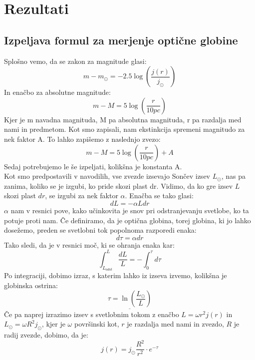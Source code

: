 \documentclass[12pt, a4paper]{article}
\begin{document}
\pagebreak
\section{Rezultati}
\subsection{Izpeljava formul za merjenje optične globine}
Splošno vemo, da se zakon za  magnitude glasi:
\begin{equation} \label{eq:Eq2}
	   m-m_{\odot}=-2.5\log\left(\frac{j(r)}{j_{\odot}}\right)
		\end{equation}
In enačbo za absolutne magnitude:
\begin{equation} \label{eq:Eq3}
	   m-M=5\log\left(\frac{r}{10pc}\right)
		\end{equation}
Kjer je m navadna magnituda, M pa absolutna magnituda, r pa razdalja med nami in predmetom. Kot smo zapisali, nam ekstinkcija spremeni magnitudo za nek faktor A. To lahko zapišemo z naslednjo zvezo:
\begin{equation} \label{eq:Eq4}
	   m-M=5\log\left(\frac{r}{10pc}\right)+A
		\end{equation}
Sedaj potrebujemo le še izpeljati, kolikšna je konstanta A.\\

Kot smo predpostavili v navodilih, vse zvezde izsevajo Sončev izsev $L_{\odot}$, nas pa zanima, koliko se je izgubi, ko pride skozi plast dr. Vidimo, da ko gre izsev $L$ skozi plast $dr$, se izgubi za nek faktor $\alpha$. Enačba se tako glasi:
$$dL=-\alpha L dr$$
$\alpha$ nam v resnici pove, kako učinkovita je snov pri odstranjevanju svetlobe, ko ta potuje proti nam. Če definiramo, da je optična globina, torej globina, ki jo lahko dosežemo, preden se svetlobni tok popolnoma razporedi enaka:
$$d\tau=\alpha dr$$
Tako sledi, da je v resnici moč, ki se ohranja enaka kar:
$$\int_{L_{odot}}^{L}\frac{dL}{L}=-\int_{0}^{\tau}d\tau$$
Po integraciji, dobimo izraz, s katerim lahko iz izseva izvemo, kolikšna je globinska ostrina:
\begin{equation} \label{eq:Eq5}
	  \underline{\tau=\ln\left(\frac{L_{\odot}}{L}\right)}
		\end{equation}
\medskip
Če pa naprej izrazimo izsev s svetlobnim tokom z enačbo $L=\omega r^2 j(r)$ in $L_{\odot}=\omega R^2 j_{\odot}$, kjer je $\omega$ površinski kot, $r$ je razdalja med nami in zvezdo, $R$ je radij zvezde, dobimo, da je:
\begin{equation} \label{eq:Eq6}
	  j(r)=j_{\odot}\frac{R^2}{r^2}\cdot e^{-\tau}
		\end{equation}
\medskip
\end{document}

